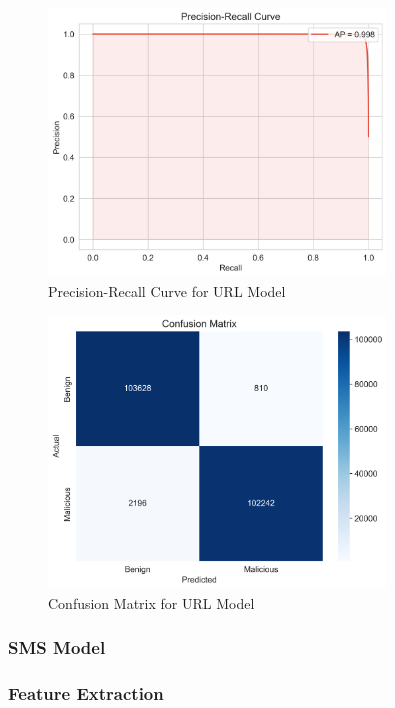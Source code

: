 \documentclass{article}
\begin{document}
\begin{figure}[htbp]
    \centering
    \includegraphics[width=0.8\textwidth]{../analysis/url/precision_recall_curve.png}
    \caption{Precision-Recall Curve for URL Model}
    \label{fig:precision_recall_curve_1}
\end{figure}

\begin{figure}[htbp]
    \centering
    \includegraphics[width=0.8\textwidth]{../analysis/url/confusion_matrix.png}
    \caption{Confusion Matrix for URL Model}
    \label{fig:confusion_matrix_1}
\end{figure}

\subsubsection{SMS Model}
\subsubsection*{Feature Extraction}
\end{document}
